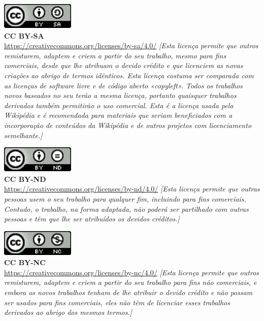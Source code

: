 \noindent
\includegraphics[]{images/CCBYSA.png}
\\
\textbf{CC BY-SA}
\\
\url{https://creativecommons.org/licenses/by-sa/4.0/}
\textit{[Esta licença permite que outros remisturem, adaptem e criem a partir do seu trabalho, mesmo para fins comerciais, desde que lhe atribuam o devido crédito e que licenciem as novas criações ao abrigo de termos idênticos. Esta licença costuma ser comparada com as licenças de software livre e de código aberto «copyleft». Todos os trabalhos novos baseados no seu terão a mesma licença, portanto quaisquer trabalhos derivados também permitirão o uso comercial. Esta é a licença usada pela Wikipédia e é recomendada para materiais que seriam beneficiados com a incorporação de conteúdos da Wikipédia e de outros projetos com licenciamento semelhante.]}


\noindent
\includegraphics[]{images/CCBYND.png}
\\
\textbf{CC BY-ND}
\\
\url{https://creativecommons.org/licenses/by-nd/4.0/}
\textit{[Esta licença permite que outras pessoas usem o seu trabalho para qualquer fim, incluindo para fins comerciais. Contudo, o trabalho, na forma adaptada, não poderá ser partilhado com outras pessoas e têm que lhe ser atribuídos os devidos créditos.]}


\noindent
\includegraphics[]{images/CCBYNC.png}
\\
\textbf{CC BY-NC}
\\
\url{https://creativecommons.org/licenses/by-nc/4.0/}
\textit{[Esta licença permite que outros remisturem, adaptem e criem a partir do seu trabalho para fins não comerciais, e embora os novos trabalhos tenham de lhe atribuir o devido crédito e não possam ser usados para fins comerciais, eles não têm de licenciar esses trabalhos derivados ao abrigo dos mesmos termos.]}

